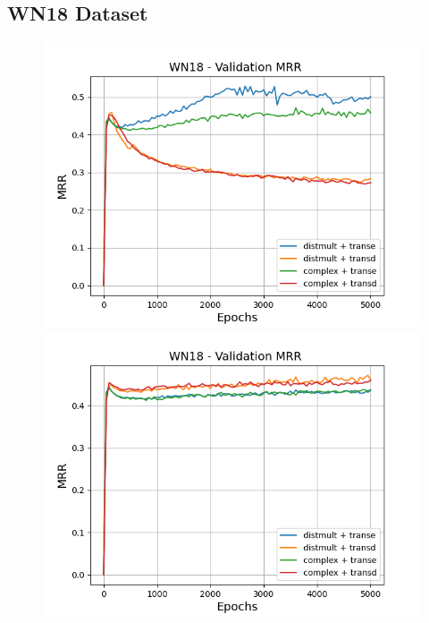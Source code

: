 \subsection{WN18 Dataset}

\begin{figure}
    \centering
    \begin{minipage}{.5\textwidth}
      \centering
      \includegraphics[width=0.9\linewidth]{figures/results/gan_train/not_pretrained/uncertainty/max/entropy/wn18/gan_train_uncertainty_wn18_mrrs.png}
    \end{minipage}%
    \begin{minipage}{.5\textwidth}
      \centering
      \includegraphics[width=0.9\linewidth]{figures/results/gan_train/not_pretrained/uncertainty/max_distribution/entropy/wn18/gan_train_uncertainty_wn18_mrrs.png}
    \end{minipage}

\end{figure}
